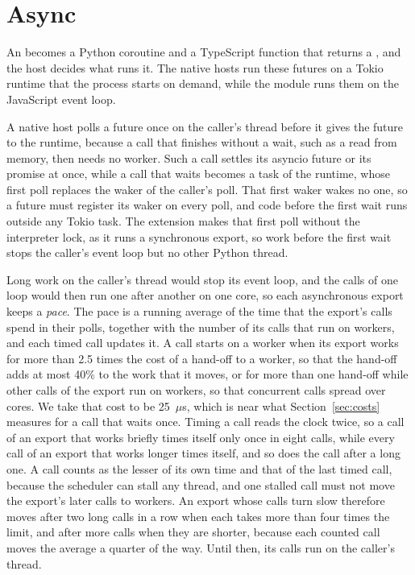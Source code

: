 \documentclass[sigconf,nonacm]{acmart}
\begin{document}
\section{Async}
\label{sec:async}

An  becomes a Python coroutine and a TypeScript function that returns a , and the host decides what runs it. The native hosts run these futures on a Tokio runtime that the process starts on demand, while the module runs them on the JavaScript event loop.

A native host polls a future once on the caller's thread before it gives the future to the runtime, because a call that finishes without a wait, such as a read from memory, then needs no worker. Such a call settles its asyncio future or its promise at once, while a call that waits becomes a task of the runtime, whose first poll replaces the waker of the caller's poll. That first waker wakes no one, so a future must register its waker on every poll, and code before the first wait runs outside any Tokio task. The extension makes that first poll without the interpreter lock, as it runs a synchronous export, so work before the first wait stops the caller's event loop but no other Python thread.

Long work on the caller's thread would stop its event loop, and the calls of one loop would then run one after another on one core, so each asynchronous export keeps a \emph{pace}. The pace is a running average of the time that the export's calls spend in their polls, together with the number of its calls that run on workers, and each timed call updates it. A call starts on a worker when its export works for more than 2.5 times the cost of a hand-off to a worker, so that the hand-off adds at most 40\% to the work that it moves, or for more than one hand-off while other calls of the export run on workers, so that concurrent calls spread over cores. We take that cost to be 25~$\mu$s, which is near what Section~\ref{sec:costs} measures for a call that waits once. Timing a call reads the clock twice, so a call of an export that works briefly times itself only once in eight calls, while every call of an export that works longer times itself, and so does the call after a long one. A call counts as the lesser of its own time and that of the last timed call, because the scheduler can stall any thread, and one stalled call must not move the export's later calls to workers. An export whose calls turn slow therefore moves after two long calls in a row when each takes more than four times the limit, and after more calls when they are shorter, because each counted call moves the average a quarter of the way. Until then, its calls run on the caller's thread.
\end{document}
